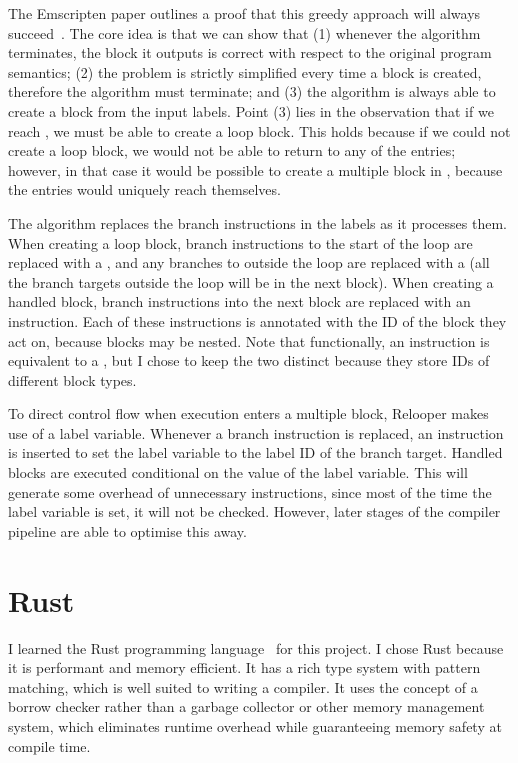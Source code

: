 \documentclass[00-main.tex]{subfiles}
\begin{document}
The Emscripten paper outlines a proof that this greedy approach will always succeed~.
The core idea is that we can show that (1) whenever the algorithm terminates, the block it outputs is correct with respect to the original program semantics; (2) the problem is strictly simplified every time a block is created, therefore the algorithm must terminate; and (3) the algorithm is always able to create a block from the input labels.
Point (3) lies in the observation that if we reach , we must be able to create a loop block.
This holds because if we could not create a loop block, we would not be able to return to any of the entries; however, in that case it would be possible to create a multiple block in , because the entries would uniquely reach themselves.

The algorithm replaces the branch instructions in the labels as it processes them.
When creating a loop block, branch instructions to the start of the loop are replaced with a , and any branches to outside the loop are replaced with a  (all the branch targets outside the loop will be in the next block).
When creating a handled block, branch instructions into the next block are replaced with an  instruction.
Each of these instructions is annotated with the ID of the block they act on, because blocks may be nested.
Note that functionally, an  instruction is equivalent to a , but I chose to keep the two distinct because they store IDs of different block types.

To direct control flow when execution enters a multiple block, Relooper makes use of a label variable.
Whenever a branch instruction is replaced, an instruction is inserted to set the label variable to the label ID of the branch target.
Handled blocks are executed conditional on the value of the label variable.
This will generate some overhead of unnecessary instructions, since most of the time the label variable is set, it will not be checked.
However, later stages of the compiler pipeline are able to optimise this away.


\section{Rust}\label{sec:prep:rust}

I learned the Rust programming language~ for this project.
I chose Rust because it is performant and memory efficient.
It has a rich type system with pattern matching, which is well suited to writing a compiler.
It uses the concept of a borrow checker rather than a garbage collector or other memory management system, which eliminates runtime overhead while guaranteeing memory safety at compile time.
\end{document}
